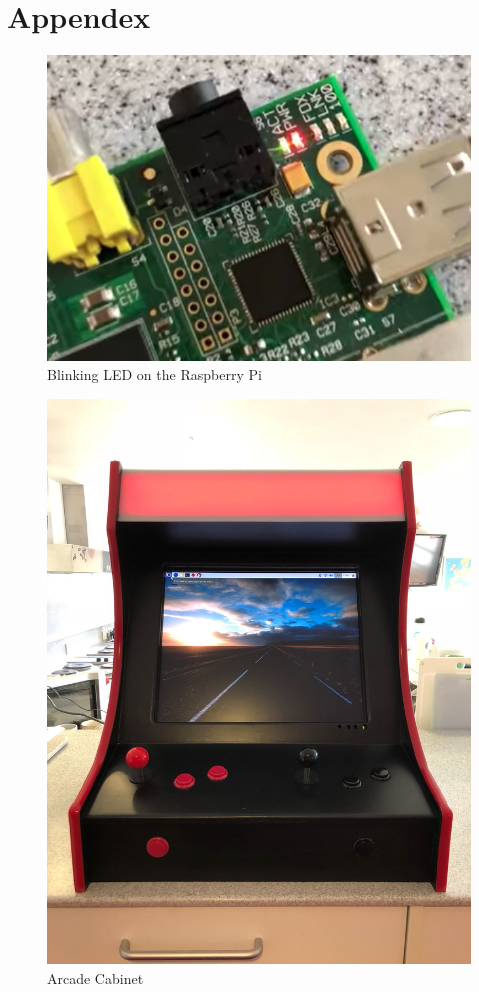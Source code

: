\documentclass[11pt,twoside]{article}
\begin{document}
\newpage
\section{Appendex}
\begin{figure}[h]
    \centering
    \includegraphics[width=\textwidth]{c_project_led}
    \caption{Blinking LED on the Raspberry Pi}
    \label{fig:led}
\end{figure}
\begin{figure}[h]
    \centering
    \includegraphics[width=\textwidth]{c_project_cabinet1}
    \caption{Arcade Cabinet}
    \label{fig:cabinet}
\end{figure}
\end{document}
